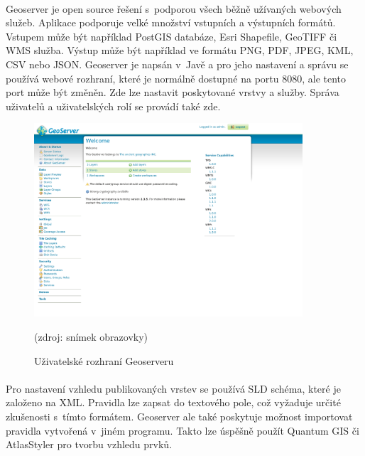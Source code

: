 \documentclass[11pt,a4paper,titlepage,oneside]{book}
\begin{document}
		\paragraph{} Geoserver je open source řešení s~podporou všech běžně užívaných webo\-vých služeb. Aplikace podporuje velké množství vstupních a výstupních formátů. Vstupem může být například PostGIS databáze, Esri Shapefile, GeoTIFF či \ac{WMS} služba. Výstup může být například ve formátu PNG, PDF, JPEG, KML, CSV nebo JSON.  Geoserver je napsán v~Javě a pro jeho nastavení a správu se používá webové rozhraní, které je normálně dostupné na portu 8080, ale tento port může být změněn. Zde lze nastavit poskytované vrstvy a služby. Správa uživatelů a uživatelských rolí se provádí také zde. 
		\begin{figure}[!h]
			\begin{center}
				\includegraphics[width=10cm]{obrazky/geoserver.png}
				\caption{Uživatelské rozhraní Geoserveru}
				(zdroj: snímek obrazovky)
			\end{center}
		\end{figure}



		\paragraph{}Pro nastavení vzhledu publikovaných vrstev se používá \ac{SLD} schéma, které je založeno na  \ac{XML}. Pravidla lze zapsat do textového pole, což vyžaduje určité zkušenosti s~tímto formátem. Geoserver ale také poskytuje možnost importovat pravidla  vytvořená v~jiném programu. Takto lze úspěšně použít Quantum GIS\cite{qgis} či AtlasStyler\cite{atlas} pro tvorbu vzhledu prvků.
\end{document}
